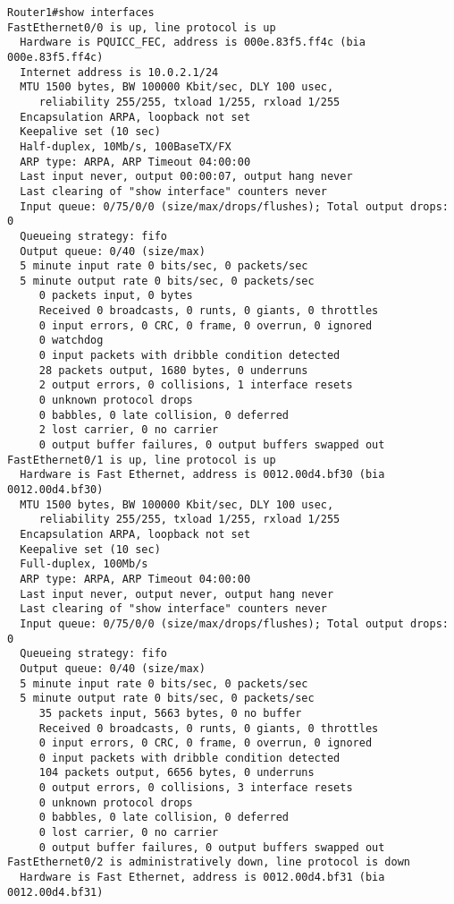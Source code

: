 \begin{lstlisting}
Router1#show interfaces
FastEthernet0/0 is up, line protocol is up 
  Hardware is PQUICC_FEC, address is 000e.83f5.ff4c (bia 000e.83f5.ff4c)
  Internet address is 10.0.2.1/24
  MTU 1500 bytes, BW 100000 Kbit/sec, DLY 100 usec, 
     reliability 255/255, txload 1/255, rxload 1/255
  Encapsulation ARPA, loopback not set
  Keepalive set (10 sec)
  Half-duplex, 10Mb/s, 100BaseTX/FX
  ARP type: ARPA, ARP Timeout 04:00:00
  Last input never, output 00:00:07, output hang never
  Last clearing of "show interface" counters never
  Input queue: 0/75/0/0 (size/max/drops/flushes); Total output drops: 0
  Queueing strategy: fifo
  Output queue: 0/40 (size/max)
  5 minute input rate 0 bits/sec, 0 packets/sec
  5 minute output rate 0 bits/sec, 0 packets/sec
     0 packets input, 0 bytes
     Received 0 broadcasts, 0 runts, 0 giants, 0 throttles
     0 input errors, 0 CRC, 0 frame, 0 overrun, 0 ignored
     0 watchdog
     0 input packets with dribble condition detected
     28 packets output, 1680 bytes, 0 underruns
     2 output errors, 0 collisions, 1 interface resets
     0 unknown protocol drops
     0 babbles, 0 late collision, 0 deferred
     2 lost carrier, 0 no carrier
     0 output buffer failures, 0 output buffers swapped out
FastEthernet0/1 is up, line protocol is up 
  Hardware is Fast Ethernet, address is 0012.00d4.bf30 (bia 0012.00d4.bf30)
  MTU 1500 bytes, BW 100000 Kbit/sec, DLY 100 usec, 
     reliability 255/255, txload 1/255, rxload 1/255
  Encapsulation ARPA, loopback not set
  Keepalive set (10 sec)
  Full-duplex, 100Mb/s
  ARP type: ARPA, ARP Timeout 04:00:00
  Last input never, output never, output hang never
  Last clearing of "show interface" counters never
  Input queue: 0/75/0/0 (size/max/drops/flushes); Total output drops: 0
  Queueing strategy: fifo
  Output queue: 0/40 (size/max)
  5 minute input rate 0 bits/sec, 0 packets/sec
  5 minute output rate 0 bits/sec, 0 packets/sec
     35 packets input, 5663 bytes, 0 no buffer
     Received 0 broadcasts, 0 runts, 0 giants, 0 throttles
     0 input errors, 0 CRC, 0 frame, 0 overrun, 0 ignored
     0 input packets with dribble condition detected
     104 packets output, 6656 bytes, 0 underruns
     0 output errors, 0 collisions, 3 interface resets
     0 unknown protocol drops
     0 babbles, 0 late collision, 0 deferred
     0 lost carrier, 0 no carrier
     0 output buffer failures, 0 output buffers swapped out
FastEthernet0/2 is administratively down, line protocol is down 
  Hardware is Fast Ethernet, address is 0012.00d4.bf31 (bia 0012.00d4.bf31)

\end{lstlisting}
